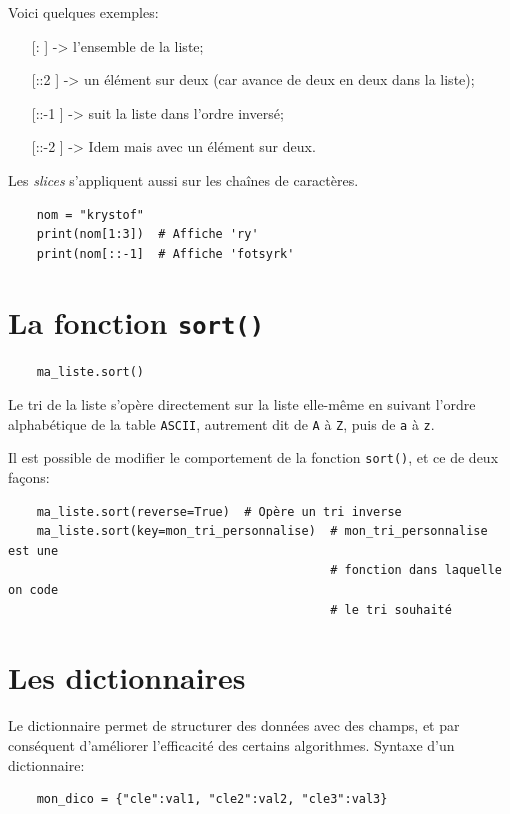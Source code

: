\documentclass[a4paper,11pt]{book}
\begin{document}
Voici quelques exemples:
\begin{itemize}
	\item[[:]] -> l'ensemble de la liste;
	\item[[::2]] -> un élément sur deux (car avance de deux en deux dans la liste);
	\item[[::-1]] -> suit la liste dans l'ordre inversé;
	\item[[::-2]] -> Idem mais avec un élément sur deux.
\end{itemize}
\medskip

Les \textit{slices} s'appliquent aussi sur les chaînes de caractères.
\begin{verbatim}
    nom = "krystof"
    print(nom[1:3])  # Affiche 'ry'
    print(nom[::-1]  # Affiche 'fotsyrk'
\end{verbatim}
\medskip

\section{La fonction \texttt{sort()}}
\begin{verbatim}
    ma_liste.sort()
\end{verbatim}
\medskip

Le tri de la liste s'opère directement sur la liste elle-même en suivant l'ordre alphabétique de la table \texttt{ASCII}, autrement dit de \texttt{A} à \texttt{Z}, puis de \texttt{a} à \texttt{z}.
\medskip

Il est possible de modifier le comportement de la fonction \texttt{sort()}, et ce de deux façons:
\begin{verbatim}
    ma_liste.sort(reverse=True)  # Opère un tri inverse
    ma_liste.sort(key=mon_tri_personnalise)  # mon_tri_personnalise est une 
                                             # fonction dans laquelle on code 
                                             # le tri souhaité
\end{verbatim}
\medskip

\section{Les dictionnaires}\label{les_dictionnaires}
Le dictionnaire permet de structurer des données avec des champs, et par conséquent d'améliorer l'efficacité des certains algorithmes. Syntaxe d'un dictionnaire:
\begin{verbatim}
    mon_dico = {"cle":val1, "cle2":val2, "cle3":val3}
\end{verbatim}
\medskip
\end{document}
